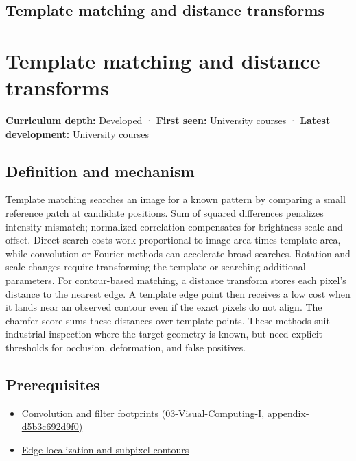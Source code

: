\hypertarget{appendix-5fb4af80d1c7}{}
\section*{Template matching and distance transforms}
\chapter{Template matching and distance transforms}\label{appendix-5fb4af80d1c7-template-matching-and-distance-transforms}

\textbf{Curriculum depth:} Developed · \textbf{First seen:} University courses · \textbf{Latest development:} University courses

\section{Definition and mechanism}\label{appendix-5fb4af80d1c7-definition-and-mechanism}

Template matching searches an image for a known pattern by comparing a small reference patch at candidate positions. Sum of squared differences penalizes intensity mismatch; normalized correlation compensates for brightness scale and offset. Direct search costs work proportional to image area times template area, while convolution or Fourier methods can accelerate broad searches. Rotation and scale changes require transforming the template or searching additional parameters. For contour-based matching, a distance transform stores each pixel's distance to the nearest edge. A template edge point then receives a low cost when it lands near an observed contour even if the exact pixels do not align. The chamfer score sums these distances over template points. These methods suit industrial inspection where the target geometry is known, but need explicit thresholds for occlusion, deformation, and false positives.

\section{Prerequisites}\label{appendix-5fb4af80d1c7-prerequisites}

\begin{itemize}
\tightlist
\item
  \href{../03-Visual-Computing-I/main.pdf\#nameddest=appendix-d5b3c692d9f0}{Convolution and filter footprints (03-Visual-Computing-I, appendix-d5b3c692d9f0)}
\item
  \hyperref[appendix-36022286b03e]{Edge localization and subpixel contours}
\end{itemize}

